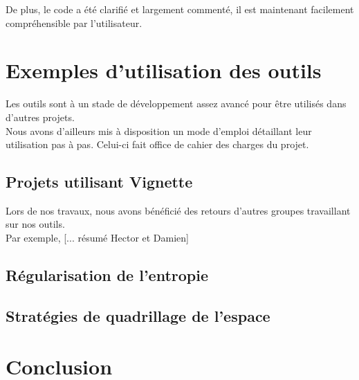 \documentclass[12pt]{article}
\begin{document}
De plus, le code a été clarifié et largement commenté, il est maintenant facilement compréhensible par l’utilisateur. \\

\section{Exemples d'utilisation des outils}

Les outils sont à un stade de développement assez avancé pour être utilisés dans d'autres projets. \\

Nous avons d'ailleurs mis à disposition un mode d'emploi détaillant leur utilisation pas à pas. Celui-ci fait office de cahier des charges du projet. \\

\subsection{Projets utilisant Vignette}
Lors de nos travaux, nous avons bénéficié des retours d'autres groupes travaillant sur nos outils. \\

Par exemple, [... résumé Hector et Damien] \\


\subsection{Régularisation de l'entropie}

\subsection{Stratégies de quadrillage de l'espace}

\section*{Conclusion}
\end{document}

